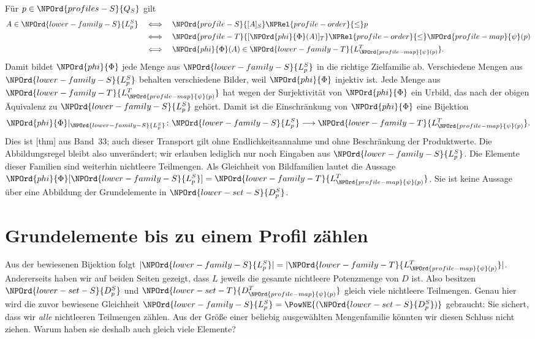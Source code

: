 Für \(p\in \NPOrd{profiles-S}{Q_S}\) gilt
\[
 \begin{aligned}
 A\in \NPOrd{lower-family-S}{L_p^S}
 &\quad\Longleftrightarrow\quad\NPOrd{profile-S}{[A]_S}\NPRel{profile-order}{\le} p\\
 &\quad\Longleftrightarrow\quad\NPOrd{profile-T}{[\NPOrd{phi}{\Phi}(A)]_T}\NPRel{profile-order}{\le}\NPOrd{profile-map}{\psi}(p)\\
 &\quad\Longleftrightarrow\quad\NPOrd{phi}{\Phi}(A)\in \NPOrd{lower-family-T}{L_{\NPOrd{profile-map}{\psi}(p)}^T}.
 \end{aligned}
\]
Damit bildet \(\NPOrd{phi}{\Phi}\) jede Menge aus \(\NPOrd{lower-family-S}{L_p^S}\) in die richtige
Zielfamilie ab. Verschiedene Mengen aus \(\NPOrd{lower-family-S}{L_p^S}\) behalten verschiedene
Bilder, weil \(\NPOrd{phi}{\Phi}\) injektiv ist. Jede Menge aus
\(\NPOrd{lower-family-T}{L_{\NPOrd{profile-map}{\psi}(p)}^T}\) hat wegen der Surjektivität von \(\NPOrd{phi}{\Phi}\) ein
Urbild, das nach der obigen Äquivalenz zu \(\NPOrd{lower-family-S}{L_p^S}\) gehört.
Damit ist die Einschränkung von \(\NPOrd{phi}{\Phi}\) eine Bijektion
\[
 \NPOrd{phi}{\Phi}|_{\NPOrd{lower-family-S}{L_p^S}}\colon \NPOrd{lower-family-S}{L_p^S}\longrightarrow \NPOrd{lower-family-T}{L_{\NPOrd{profile-map}{\psi}(p)}^T}.
\]
Dies ist [thm] aus Band~33;
auch dieser Transport gilt ohne Endlichkeitsannahme und ohne
Beschränkung der Produktwerte.
Die Abbildungsregel bleibt also unverändert; wir erlauben lediglich
nur noch Eingaben aus \(\NPOrd{lower-family-S}{L_p^S}\). Die Elemente dieser Familien
sind weiterhin nichtleere Teilmengen. Als Gleichheit von Bildfamilien lautet
die Aussage \(\NPOrd{phi}{\Phi}[\NPOrd{lower-family-S}{L_p^S}]=\NPOrd{lower-family-T}{L_{\NPOrd{profile-map}{\psi}(p)}^T}\). Sie ist keine Aussage
über eine Abbildung der Grundelemente in \(\NPOrd{lower-set-S}{D_p^S}\).

\par{}
\section*{Grundelemente bis zu einem Profil zählen}

Aus der bewiesenen Bijektion folgt \(|\NPOrd{lower-family-S}{L_p^S}|=|\NPOrd{lower-family-T}{L_{\NPOrd{profile-map}{\psi}(p)}^T}|\).
Andererseits haben wir auf beiden Seiten gezeigt, dass \(L\) jeweils
die gesamte nichtleere Potenzmenge von \(D\) ist. Also besitzen
\(\NPOrd{lower-set-S}{D_p^S}\) und \(\NPOrd{lower-set-T}{D_{\NPOrd{profile-map}{\psi}(p)}^T}\) gleich viele nichtleere Teilmengen.
Genau hier wird die zuvor bewiesene Gleichheit
\(\NPOrd{lower-family-S}{L_p^S}=\PowNE{(\NPOrd{lower-set-S}{D_p^S})}\) gebraucht: Sie sichert, dass wir
\emph{alle} nichtleeren Teilmengen zählen. Aus der Größe einer
beliebig ausgewählten Mengenfamilie könnten wir diesen Schluss
nicht ziehen.
Warum haben sie deshalb auch gleich viele Elemente?

